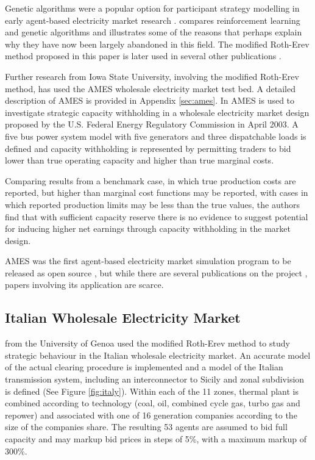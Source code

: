 Genetic algorithms were a popular option for participant strategy modelling in
early agent-based electricity market research
\cite{richter:1998,petrov:2000,lane:2000}.  compares
reinforcement learning and genetic algorithms and illustrates some of the
reasons that perhaps explain why they have now been largely abandoned in this
field. The modified Roth-Erev method proposed in this paper is later used in
several other publications \cite{cincotti:09,weidlich:06,viet:06}.

Further research from Iowa State University, involving the modified Roth-Erev
method, has used the AMES wholesale electricity market test bed.  A detailed
description of AMES is provided in Appendix \ref{sec:ames}.  In
 AMES is used to investigate strategic capacity withholding
in a wholesale electricity market design proposed by the U.S. Federal Energy
Regulatory Commission in April 2003.  A five bus power system model with five
generators and three dispatchable loads is defined and capacity withholding is
represented by permitting traders to bid lower than true operating capacity and
higher than true marginal costs.

Comparing results from a benchmark case, in which true production costs are
reported, but higher than marginal cost functions may be reported, with cases in
which reported production limits may be less than the true values, the authors
find that with sufficient capacity reserve there is no evidence to suggest
potential for inducing higher net earnings through capacity withholding in the
market design.

AMES was the first agent-based electricity market simulation program to be
released as open source \cite{tesfatsi:wpmp}, but while there are several
publications on the project \cite{tesfatsi:dcopf,tesfatsi:pes09}, papers
involving its application are scarce.

\subsection{Italian Wholesale Electricity Market}


 from the University of Genoa used the modified Roth-Erev
method to study strategic behaviour in the Italian wholesale electricity market.
 An accurate model of the actual clearing procedure is implemented and a model
of the Italian transmission system, including an interconnector to Sicily and
zonal subdivision is defined (See Figure \ref{fig:italy}). Within each of the 11
zones, thermal plant is combined according to technology (coal, oil, combined
cycle gas, turbo gas and repower) and associated with one of 16 generation
companies according to the size of the companies share.  The resulting 53 agents
are assumed to bid full capacity and may markup bid prices in steps of 5\%, with
a maximum markup of 300\%.

